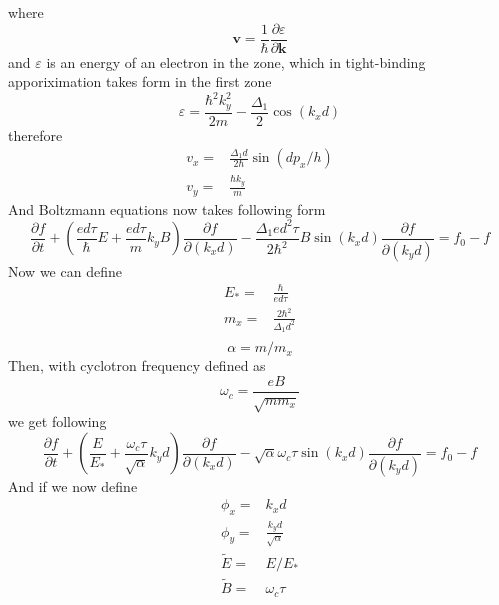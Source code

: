 \documentclass[40pt,letterpaper,physrev]{article}
\begin{document}
    where 
    \begin{equation}
     \mathbf{v}=\frac{1}{\hbar}\frac{\partial\varepsilon}{\partial\mathbf{k}}
    \end{equation}
    and $\varepsilon$ is an energy of an electron in the zone, which in tight-binding apporiximation takes form in the first zone
    \begin{equation}
     \varepsilon=\frac{\hbar^2k^2_y}{2m}-\frac{\Delta_{1}}{2}\cos(k_{x}d)\label{eq:energy_unscaled}
    \end{equation}
    therefore
    \begin{align}
     v_x=&\frac{\Delta_{1}d}{2\hbar}\sin(dp_x/h) \\
     v_y=&\frac{\hbar k_y}{m}
    \end{align}
    And Boltzmann equations now takes following form
   \begin{equation}
     \frac{\partial f}{\partial t}+
     \left ( \frac{ed\tau}{\hbar}E+\frac{ed\tau}{m}k_yB \right ) \frac{\partial f}{\partial(k_x d)}-
     \frac{\Delta_{1}ed^2\tau}{2\hbar^2}B\sin(k_{x}d)\frac{\partial f}{\partial(k_y d)}
     = f_0 - f
   \end{equation}
   Now we can define
   \begin{align}
	E_*=&\frac{\hbar}{ed\tau} \\	
	m_x=&\frac{2\hbar^2}{\Delta_1 d^2} \\
   \end{align}
   \begin{equation}
	\boxed{\alpha=m/m_x}
   \end{equation}
   Then, with cyclotron frequency defined as 
   \begin{equation}
	\omega_c=\frac{eB}{\sqrt{mm_x}}
   \end{equation}
   we get following
   \begin{equation}
     \frac{\partial f}{\partial t}+
     \left ( \frac{E}{E_*}+\frac{\omega_{c}\tau}{\sqrt{\alpha}}k_yd \right ) \frac{\partial f}{\partial(k_x d)}-
     \sqrt{\alpha}\omega_c\tau\sin(k_x d)\frac{\partial f}{\partial(k_y d)}
     = f_0 - f
   \end{equation}
   And if we now define
   \begin{align}
       \phi_x=&k_{x}d \\
       \phi_y=&\frac{k_{y}d}{\sqrt{\alpha}} \\
       \tilde{E}=&E/E_*\\
       \tilde{B}=&\omega_{c}\tau
   \end{align}
\end{document}
